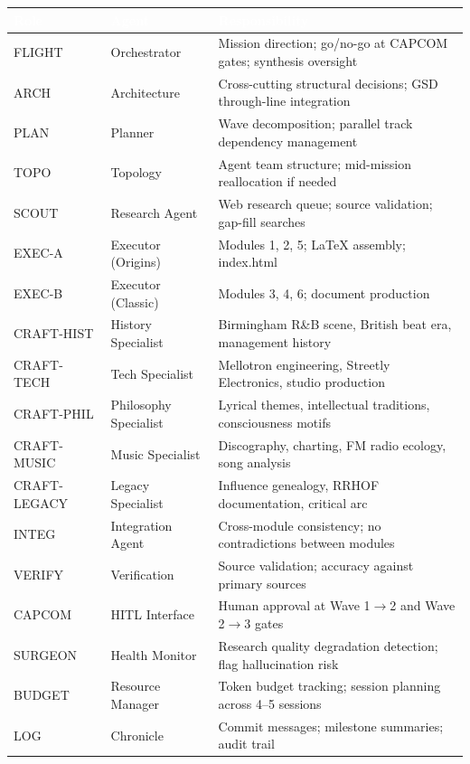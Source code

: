 \documentclass[11pt,letterpaper]{article}
\newcommand{\tableheader}[1]{\textbf{\sffamily\textcolor{white}{#1}}}
\begin{document}
\begin{center}
\begin{tabularx}{\textwidth}{L{2cm}L{2.5cm}X}
\toprule
{}
\tableheader{Role} & \tableheader{Agent} & \tableheader{Responsibility} \\
\midrule
FLIGHT & Orchestrator & Mission direction; go/no-go at CAPCOM gates; synthesis oversight \\
ARCH & Architecture & Cross-cutting structural decisions; GSD through-line integration \\
PLAN & Planner & Wave decomposition; parallel track dependency management \\
TOPO & Topology & Agent team structure; mid-mission reallocation if needed \\
SCOUT & Research Agent & Web research queue; source validation; gap-fill searches \\
EXEC-A & Executor (Origins) & Modules 1, 2, 5; LaTeX assembly; index.html \\
EXEC-B & Executor (Classic) & Modules 3, 4, 6; document production \\
CRAFT-HIST & History Specialist & Birmingham R\&B scene, British beat era, management history \\
CRAFT-TECH & Tech Specialist & Mellotron engineering, Streetly Electronics, studio production \\
CRAFT-PHIL & Philosophy Specialist & Lyrical themes, intellectual traditions, consciousness motifs \\
CRAFT-MUSIC & Music Specialist & Discography, charting, FM radio ecology, song analysis \\
CRAFT-LEGACY & Legacy Specialist & Influence genealogy, RRHOF documentation, critical arc \\
INTEG & Integration Agent & Cross-module consistency; no contradictions between modules \\
VERIFY & Verification & Source validation; accuracy against primary sources \\
CAPCOM & HITL Interface & Human approval at Wave 1$\to$2 and Wave 2$\to$3 gates \\
SURGEON & Health Monitor & Research quality degradation detection; flag hallucination risk \\
BUDGET & Resource Manager & Token budget tracking; session planning across 4--5 sessions \\
LOG & Chronicle & Commit messages; milestone summaries; audit trail \\
\bottomrule
\end{tabularx}
\end{center}
\end{document}
